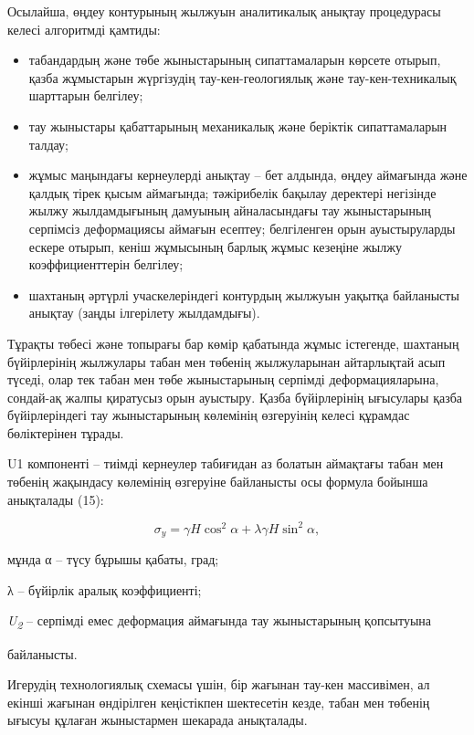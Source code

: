 \begin{multicols}{2}
Осылайша, өңдеу контурының жылжуын аналитикалық анықтау процедурасы
келесі алгоритмді қамтиды:

\begin{itemize}
\item
  табандардың және төбе жыныстарының сипаттамаларын көрсете отырып,
  қазба жұмыстарын жүргізудің тау-кен-геологиялық және
  тау-кен-техникалық шарттарын белгілеу;
\item
  тау жыныстары қабаттарының механикалық және беріктік сипаттамаларын
  талдау;
\item
  жұмыс маңындағы кернеулерді анықтау -- бет алдында, өңдеу аймағында
  және қалдық тірек қысым аймағында; тәжірибелік бақылау деректері
  негізінде жылжу жылдамдығының дамуының айналасындағы тау жыныстарының
  серпімсіз деформациясы аймағын есептеу; белгіленген орын ауыстыруларды
  ескере отырып, кеніш жұмысының барлық жұмыс кезеңіне жылжу
  коэффициенттерін белгілеу;
\item
  шахтаның әртүрлі учаскелеріндегі контурдың жылжуын уақытқа байланысты
  анықтау (заңды ілгерілету жылдамдығы).
\end{itemize}

Тұрақты төбесі және топырағы бар көмір қабатында жұмыс істегенде,
шахтаның бүйірлерінің жылжулары табан мен төбенің жылжуларынан
айтарлықтай асып түседі, олар тек табан мен төбе жыныстарының серпімді
деформацияларына, сондай-ақ жалпы қиратусыз орын ауыстыру. Қазба
бүйірлерінің ығысулары қазба бүйірлеріндегі тау жыныстарының көлемінің
өзгеруінің келесі құрамдас бөліктерінен тұрады.

U1 компоненті -- тиімді кернеулер табиғидан аз болатын аймақтағы табан
мен төбенің жақындасу көлемінің өзгеруіне байланысты осы формула бойынша
анықталады (15):

\begin{equation}
\sigma_{y} = \gamma H\cos^{2}\alpha + \lambda\gamma H\sin^{2}\alpha,
\end{equation}

мұнда α -- түсу бұрышы қабаты, град;

λ -- бүйірлік аралық коэффициенті;

\emph{U\textsubscript{2}} -- серпімді емес деформация аймағында тау
жыныстарының қопсытуына

байланысты.

Игерудің технологиялық схемасы үшін, бір жағынан тау-кен массивімен, ал
екінші жағынан өндірілген кеңістікпен шектесетін кезде, табан мен
төбенің ығысуы құлаған жыныстармен шекарада анықталады.


\end{multicols}
